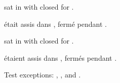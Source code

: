 \documentclass{article}
\begin{document}

 sat in  with  closed for .

 était assis dans ,  fermé pendant .

 sat in  with  closed for .

 étaient assis dans , 
fermés pendant .

Test exceptions:
, ,  and .

\printunsrtglossaries
\end{document}
